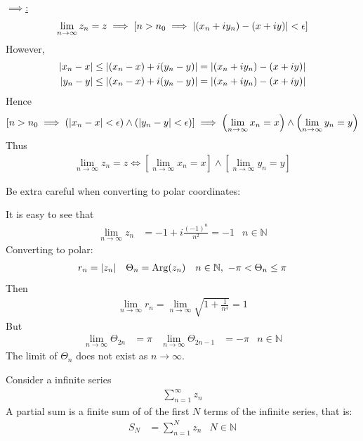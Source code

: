 \documentclass[12pt, english]{book}
\makeatletter
\renewenvironment{proof}[1][\proofname]{\par
	\pushQED{\qed}%
	\normalfont \topsep6\p@\@plus6\p@\relax
	\list{}{%
		\settowidth{\leftmargin}{\itshape\proofname:\hskip\labelsep}%
		\setlength{\labelwidth}{0pt}%
		\setlength{\itemindent}{-\leftmargin}%
		}%
	\item[\hskip\labelsep\itshape#1\@addpunct{:}]\ignorespaces
	}{\popQED\endlist\@endpefalse}
\makeatother
\begin{document}
\begin{proof}
		\underline{\(\implies\):} 
		\begin{align*}
			\lim_{n \rightarrow \infty} z_n = z 
			\implies \left[n > n_0 \implies \abs{(x_n + iy_n) - (x + iy)} < \epsilon \right]
		\end{align*}
		However,
		\begin{align*}
			\abs{x_n - x} &\leq \abs{(x_n - x) + i(y_n - y)} = \abs{(x_n + iy_n) - (x + iy)}  \\
			\abs{y_n - y} &\leq \abs{(x_n - x) + i(y_n - y)} = \abs{(x_n + iy_n) - (x + iy)} 
		\end{align*}
		Hence 
		\begin{align*}
			\left[ 
			n > n_0 
			\implies\left(\abs{x_n - x} < \epsilon \right)
				\land \left(\abs{y_n - y} < \epsilon \right)
			\right]
			\implies \left(\lim_{n \rightarrow \infty} x_n = x \right)
				\land \left(\lim_{n \rightarrow \infty} y_n = y \right)
		\end{align*}
		Thus 
		\begin{align*}
			\lim_{n \rightarrow \infty} z_n = z 
			\iff \left[\lim_{n \rightarrow \infty} x_n = x \right] \land 
			\left[\lim_{n \rightarrow \infty} y_n = y \right] 
		\end{align*}
	\end{proof}

	Be extra careful when converting to polar coordinates:
	\begin{example}
		It is easy to see that 
		\begin{align*}
			\lim_{n \rightarrow \infty}
			z_n &= -1 + i \frac{(-1)^n}{n^2} = -1 & n \in \mathbb{N}
		\end{align*}
		Converting to polar: 
		\begin{align*}
			r_n &= \abs{z_n} & \Theta_n &= \operatorname{Arg}(z_n) 
				& n \in \mathbb{N}, \ -\pi < \Theta_n \leq \pi
		\end{align*}
		Then 
		\begin{align*}
			\lim_{n \rightarrow \infty} r_n = \lim_{n \rightarrow \infty} \sqrt{1 + \frac{1}{n^4}} = 1
		\end{align*}
		But
		\begin{align*}
			\lim_{n \rightarrow \infty} \Theta_{2n} &= \pi &
			\lim_{n \rightarrow \infty} \Theta_{2n-1} &= -\pi
				& n \in \mathbb{N}
		\end{align*}
		The limit of \(\Theta_n\) does not exist as \(n \rightarrow \infty\).
	\end{example}

	\begin{definition}
		\label{Partial Sum (Series) Definition - Complex}
		Consider a infinite series
		\begin{align*}
			\sum_{n=1}^{\infty} z_n
		\end{align*}
		A partial sum is a finite sum of of the first \(N\) terms of the infinite series, that is:
		\begin{align*}
			S_N &= \sum_{n=1}^{N} z_n & N \in \mathbb{N}
		\end{align*}
	\end{definition}
	
\end{document}
